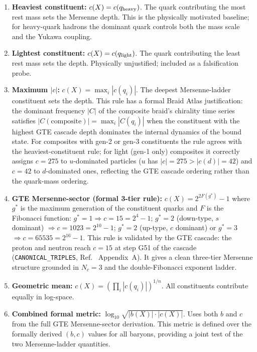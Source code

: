 \documentclass[12pt,a4paper]{article}
\begin{document}
\begin{enumerate}[leftmargin=2em]
\item \textbf{Heaviest constituent:} $c(X) = c(q_{\rm heavy})$.
  The quark contributing the most rest mass sets the Mersenne depth.
  This is the physically motivated baseline; for heavy-quark hadrons the
  dominant quark controls both the mass scale and the Yukawa coupling.

\item \textbf{Lightest constituent:} $c(X) = c(q_{\rm light})$.
  The quark contributing the least rest mass sets the depth.
  Physically unjustified; included as a falsification probe.

\item \textbf{Maximum $|c|$:}
  $c(X) = \max_i |c(q_i)|$.
  The deepest Mersenne-ladder constituent sets the depth.
  This rule has a formal Braid Atlas justification: the dominant frequency
  $|C|$ of the composite braid's chirality time series satisfies
  $|C(\text{composite})| = \max_i |C(q_i)|$ when the constituent with the
  highest GTE cascade depth dominates the internal dynamics of the bound state.
  For composites with gen-2 or gen-3 constituents the rule agrees with
  the heaviest-constituent rule; for light (gen-1 only) composites
  it correctly assigns $c = 275$ to $u$-dominated particles
  ($u$ has $|c| = 275 > |c(d)| = 42$) and $c = 42$ to $d$-dominated ones,
  reflecting the GTE cascade ordering rather than the quark-mass ordering.

\item \textbf{GTE Mersenne-sector (formal 3-tier rule):}
  $c(X) = 2^{2F(g^*)}-1$ where $g^*$ is the maximum generation of the
  constituent quarks and $F$ is the Fibonacci function:
  $g^*{=}1 \Rightarrow c{=}15{=}2^4{-}1$;
  $g^*{=}2$ (down-type, $s$ dominant) $\Rightarrow c{=}1023{=}2^{10}{-}1$;
  $g^*{=}2$ (up-type, $c$ dominant) or $g^*{=}3$ $\Rightarrow c{=}65535{=}2^{16}{-}1$.
  This rule is validated by the GTE cascade: the proton and neutron reach
  $c = 15$ at step G51 of the cascade (\texttt{CANONICAL\_TRIPLES},
  Ref.~\cite{Spivack2026_SM_UGP} Appendix~A).
  It gives a clean three-tier Mersenne structure grounded in
  $N_c = 3$ and the double-Fibonacci exponent ladder.

\item \textbf{Geometric mean:}
  $c(X) = \left(\prod_i |c(q_i)|\right)^{1/n}$.
  All constituents contribute equally in log-space.

\item \textbf{Combined formal metric:} $\log_{10}\!\sqrt{|b(X)|\cdot|c(X)|}$.
  Uses both $b$ and $c$ from the full GTE Mersenne-sector derivation.
  This metric is defined over the formally derived $(b,c)$ values for all
  baryons, providing a joint test of the two Mersenne-ladder quantities.
\end{enumerate}
\end{document}
